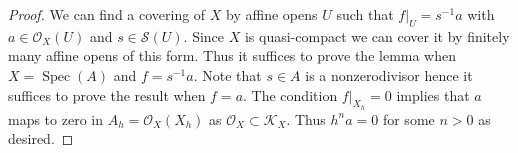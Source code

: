 \documentclass[10pt,a4paper]{amsart}
\theoremstyle{plain}
\theoremstyle{definition}
\theoremstyle{remark}
\numberwithin{equation}{subsection}
\def\Spec{\mathop{\mathrm{Spec}}}
\begin{document}
\begin{proof}
We can find a covering of $X$ by affine opens $U$ such that $f|_U = s^{-1}a$
with $a \in \mathcal{O}_X(U)$ and $s \in \mathcal{S}(U)$. Since $X$ is
quasi-compact we can cover it by finitely many affine opens of this form.
Thus it suffices to prove the lemma when $X = \Spec(A)$ and $f = s^{-1}a$.
Note that $s \in A$ is a nonzerodivisor hence it suffices to prove
the result when $f = a$. The condition $f|_{X_h} = 0$ implies that
$a$ maps to zero in $A_h = \mathcal{O}_X(X_h)$ as
$\mathcal{O}_X \subset \mathcal{K}_X$. Thus $h^na = 0$ for some $n > 0$
as desired.
\end{proof}
\end{document}

